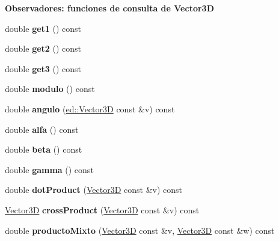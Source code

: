 \begin{Indent}\textbf{ Observadores\+: funciones de consulta de Vector3D}\par
\begin{DoxyCompactItemize}
\item 
\mbox{\label{classed_1_1Vector3D_ac96497e7c082fde19b4998408e4ec36b}} 
double {\bfseries get1} () const
\item 
\mbox{\label{classed_1_1Vector3D_acb66f2ac0cb4f24592698fb317458e35}} 
double {\bfseries get2} () const
\item 
\mbox{\label{classed_1_1Vector3D_a50c08e3089bc1b0cd5de77d8f0086cc0}} 
double {\bfseries get3} () const
\item 
\mbox{\label{classed_1_1Vector3D_a9db1b9e9d7634efeb88f60130283bc9a}} 
double {\bfseries modulo} () const
\item 
\mbox{\label{classed_1_1Vector3D_a0b41efa0f1d21a4fa730ff522ac3b5c7}} 
double {\bfseries angulo} (\mbox{\hyperlink{classed_1_1Vector3D}{ed\+::\+Vector3D}} const \&v) const
\item 
\mbox{\label{classed_1_1Vector3D_af3b622283c86e66467fd6fb766990d3b}} 
double {\bfseries alfa} () const
\item 
\mbox{\label{classed_1_1Vector3D_a0b9663bbc1b3c3237d0d83583b79597d}} 
double {\bfseries beta} () const
\item 
\mbox{\label{classed_1_1Vector3D_aeb55bfb591e508192eb11e63abbbac19}} 
double {\bfseries gamma} () const
\item 
\mbox{\label{classed_1_1Vector3D_a849531cfc47ecc3feff503f33ecf76e8}} 
double {\bfseries dot\+Product} (\mbox{\hyperlink{classed_1_1Vector3D}{Vector3D}} const \&v) const
\item 
\mbox{\label{classed_1_1Vector3D_a57182dbe569e84f8aab4cb7adde5650f}} 
\mbox{\hyperlink{classed_1_1Vector3D}{Vector3D}} {\bfseries cross\+Product} (\mbox{\hyperlink{classed_1_1Vector3D}{Vector3D}} const \&v) const
\item 
\mbox{\label{classed_1_1Vector3D_a2063f0cdfdb6a34e4f426a1f247a4459}} 
double {\bfseries producto\+Mixto} (\mbox{\hyperlink{classed_1_1Vector3D}{Vector3D}} const \&v, \mbox{\hyperlink{classed_1_1Vector3D}{Vector3D}} const \&w) const
\end{DoxyCompactItemize}
\end{Indent}
